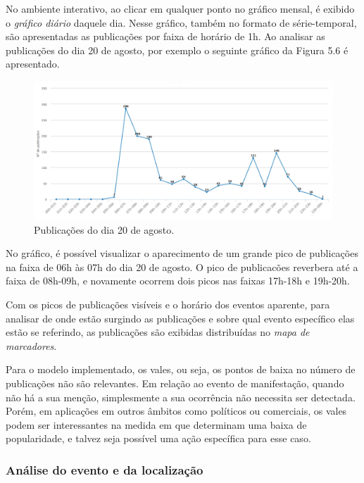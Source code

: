 No ambiente interativo, ao clicar em qualquer ponto no gráfico mensal, é exibido o \textit{gráfico diário} daquele dia. Nesse gráfico, também no formato de série-temporal, são apresentadas as publicações por faixa de horário de 1h. Ao analisar as publicações do dia 20 de agosto, por exemplo o seguinte gráfico da Figura 5.6 é apresentado.

\begin{figure}[htpb]
  \begin{center}
    \includegraphics[width=1.0\textwidth]{figuras/grafico-dia.pdf}
    \caption{Publicações do dia 20 de agosto.}
  \end{center}
\end{figure}

No gráfico, é possível visualizar o aparecimento de um grande pico de publicações na faixa de 06h às 07h do dia 20 de agosto. O pico de publicacões reverbera até a faixa de 08h-09h, e novamente ocorrem dois picos nas faixas 17h-18h e 19h-20h.

Com os picos de publicações visíveis e o horário dos eventos aparente, para analisar de onde estão surgindo as publicações e sobre qual evento específico elas estão se referindo, as publicações são exibidas distribuídas no \textit{mapa de marcadores}.

Para o modelo implementado, os vales, ou seja, os pontos de baixa no número de publicações não são relevantes. Em relação ao evento de manifestação, quando não há a sua menção, simplesmente a sua ocorrência não necessita ser detectada. Porém, em aplicações em outros âmbitos como políticos ou comerciais, os vales podem ser interessantes na medida em que determinam uma baixa de popularidade, e talvez seja possível uma ação específica para esse caso.

\subsubsection*{Análise do evento e da localização}

